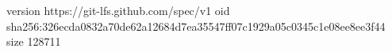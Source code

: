 version https://git-lfs.github.com/spec/v1
oid sha256:326ecda0832a70de62a12684d7ea35547ff07c1929a05c0345c1e08ee8ee3f44
size 128711
